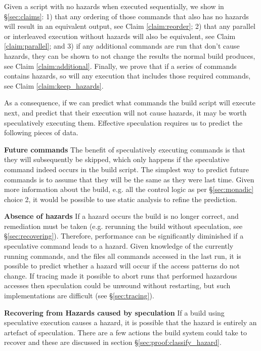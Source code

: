 Given a script with no hazards when executed sequentially, we show in \S\ref{sec:claims}: 1) that any ordering of those commands that also has no hazards will result in an equivalent output, see Claim \ref{claim:reorder}; 2) that any parallel or interleaved execution without hazards will also be equivalent, see Claim \ref{claim:parallel}; and 3) if any additional commands are run that don't cause hazards, they can be shown to not change the results the normal build produces, see Claim \ref{claim:additional}. Finally, we prove that if a series of commands contains hazards, so will any execution that includes those required commands, see Claim \ref{claim:keep_hazards}.

As a consequence, if we can predict what commands the build script will execute next, and predict that their execution will not cause hazards, it may be worth speculatively executing them. Effective speculation requires us to predict the following pieces of data.

\textbf{Future commands} The benefit of speculatively executing commands is that they will subsequently be skipped, which only happens if the speculative command indeed occurs in the build script. The simplest way to predict future commands is to assume that they will be the same as they were last time. Given more information about the build, e.g. all the control logic as per \S\ref{sec:monadic} choice 2, it would be possible to use static analysis to refine the prediction.

\textbf{Absence of hazards} If a hazard occurs the build is no longer correct, and remediation must be taken (e.g. rerunning the build without speculation, see \S\ref{sec:recovering}). Therefore, performance can be significantly diminished if a speculative command leads to a hazard. Given knowledge of the currently running commands, and the files all commands accessed in the last run, it is possible to predict whether a hazard will occur if the access patterns do not change. If tracing made it possible to abort runs that performed hazardous accesses then speculation could be unwound without restarting, but such implementations are difficult (see \S\ref{sec:tracing}).

\textbf{Recovering from Hazards caused by speculation}
If a build using speculative execution causes a hazard, it is possible that the hazard is entirely an artefact of speculation. There are a few actions the build system could take to recover and these are discussed in section \S\ref{sec:proof:classify_hazard}.
